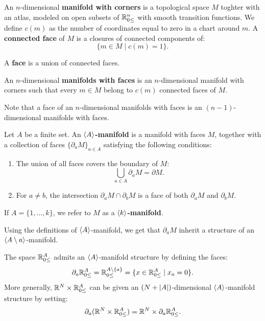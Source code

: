 \begin{defn}
An $n$-dimensional \textbf{manifold with corners} is a topological space $M$ toghter with an atlas, modeled on open subsets of $\mathbb{R}_{0 \leq}^n$ with smooth transition functions.
We define $c(m)$ as the number of coordinates equal to zero in a chart around $m$. A \textbf{connected face} of $M$ is a closures of connected components of:
\begin{equation*}
    \{ m \in M \mid c(m) = 1 \}.
\end{equation*}

A \textbf{face} is a union of connected faces.

An $n$-dimensional \textbf{manifolds with faces} is an $n$-dimensional manifold with corners such that every $m \in M$ belong to $c(m)$ connected faces of $M$.
\end{defn}

Note that a face of an $n$-dimensional manifolds with faces is an $(n-1)$-dimensional manifolds with faces. 

\begin{defn}
    Let $A$ be a finite set. An \textbf{$\langle A \rangle$-manifold} is a manifold with faces $M$, together with a collection of faces $\{ \partial_a M \}_{a \in A}$ satisfying the following conditions:
        \begin{enumerate}
            \item The union of all faces covers the boundary of $M$:
            \begin{equation*}
                \bigcup_{a \in A} \partial_a M = \partial M.
            \end{equation*}
            \item For $a \neq b$, the intersection $\partial_a M \cap \partial_b M$ is a face of both $\partial_a M$ and $\partial_b M$.
        \end{enumerate}
    If $A = \{ 1,\dotsc,k \}$, we refer to $M$ as a \textbf{$\langle k \rangle$-manifold}.
\end{defn}

\begin{note*}
    Using the definitions of $\langle A \rangle$-manifold, we get that $\partial_a M$ inherit a structure of an $\langle A\setminus{a} \rangle$-manifold.
\end{note*}

\begin{exmp}\label{exmp:R_cor_str}
The space $\mathbb{R}_{0 \leq}^A$ admits an $\langle A \rangle$-manifold structure by defining the faces:
\begin{equation*}
    \partial_a \mathbb{R}_{0 \leq}^A = \mathbb{R}_{0 \leq}^{A \setminus \{ a \}} = \{ x \in \mathbb{R}_{0 \leq}^A \mid x_a = 0 \}.
\end{equation*}
More generally, $\mathbb{R}^N \times \mathbb{R}_{0 \leq}^A$ can be given an $(N+\left\lvert A\right\rvert)$-dimensional $\langle A \rangle$-manifold structure by setting:
\begin{equation*}
    \partial_a (\mathbb{R}^N \times \mathbb{R}_{0 \leq}^A) = \mathbb{R}^N \times \partial_a \mathbb{R}_{0 \leq}^A.
\end{equation*}
\end{exmp}

